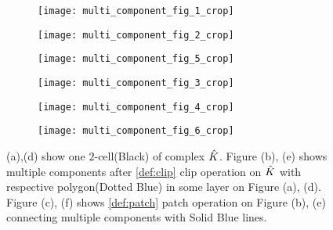 \begin{figure}[ht!]
  \centering
  \begin{subfigure}[t]{2in}
    \centering
    \texttt{[image: multi\_component\_fig\_1\_crop]}
    \caption{\label{fig:multicomponenta}}
  \end{subfigure}
  \begin{subfigure}[t]{2in}
    \centering
    \texttt{[image: multi\_component\_fig\_2\_crop]}
    \caption{\label{fig:multicomponentb}}
  \end{subfigure}
  \begin{subfigure}[t]{2in}
    \centering
    \texttt{[image: multi\_component\_fig\_5\_crop]}
    \caption{\label{fig:multicomponentc}}
  \end{subfigure}
  \begin{subfigure}[t]{2in}
    \centering
    \texttt{[image: multi\_component\_fig\_3\_crop]}
    \caption{\label{fig:multicomponentd}}
  \end{subfigure}
  \begin{subfigure}[t]{2in}
    \centering
    \texttt{[image: multi\_component\_fig\_4\_crop]}
    \caption{\label{fig:multicomponente}}
  \end{subfigure}
  \begin{subfigure}[t]{2in}
    \centering
    \texttt{[image: multi\_component\_fig\_6\_crop]}
    \caption{\label{fig:multicomponentf}}
  \end{subfigure}

  \caption{\label{fig:multicomponent}
    (a),(d) show one $2$-cell(Black) of complex $\hat{K}$. Figure (b), (e) shows multiple components after \ref{def:clip} clip operation on $\hat{K}$ with respective polygon(Dotted Blue) in some layer on Figure (a), (d). Figure (c), (f) shows \ref{def:patch} patch operation on Figure (b), (e) connecting multiple components with Solid Blue lines.}
\end{figure}

